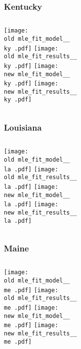 \documentclass{beamer}
\newcommand{\old}{current_two_stage_output/pyseir/state_summaries/reports/}
\newcommand{\new}{new_shortest_t_delta/pyseir/state_summaries/reports/}
\newcommand{\ky}{Kentucky__21}
\newcommand{\la}{Louisiana__22}
\newcommand{\me}{Maine__23}
\begin{document}
\begin{frame}
\frametitle{Kentucky}
    \begin{columns}[t]

       \texttt{[image: \\old mle\_fit\_model\_\_\\ky .pdf]}
       \texttt{[image: \\old mle\_fit\_results\_\_\\ky .pdf]}   
       \texttt{[image: \\new mle\_fit\_model\_\_\\ky .pdf]}
       \texttt{[image: \\new mle\_fit\_results\_\_\\ky .pdf]}   
\end{columns}
\end{frame}


\begin{frame}
\frametitle{Louisiana}
    \begin{columns}[t]

       \texttt{[image: \\old mle\_fit\_model\_\_\\la .pdf]}
       \texttt{[image: \\old mle\_fit\_results\_\_\\la .pdf]}   
       \texttt{[image: \\new mle\_fit\_model\_\_\\la .pdf]}
       \texttt{[image: \\new mle\_fit\_results\_\_\\la .pdf]}   
\end{columns}
\end{frame}

\begin{frame}
\frametitle{Maine}
    \begin{columns}[t]

       \texttt{[image: \\old mle\_fit\_model\_\_\\me .pdf]}
       \texttt{[image: \\old mle\_fit\_results\_\_\\me .pdf]}   
       \texttt{[image: \\new mle\_fit\_model\_\_\\me .pdf]}
       \texttt{[image: \\new mle\_fit\_results\_\_\\me .pdf]}   
\end{columns}
\end{frame}
\end{document}

